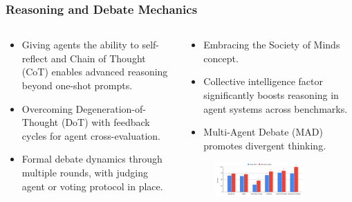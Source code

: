 \documentclass{beamer}
\begin{document}
\begin{frame}
    \frametitle{Reasoning and Debate Mechanics}
    
    \begin{columns}[T] %
        \begin{column}{.5\textwidth}
            \textbf{}
            \begin{itemize}
                \item Giving agents the ability to self-reflect and Chain of Thought (CoT) enables advanced reasoning beyond one-shot prompts.
                \item Overcoming Degeneration-of-Thought (DoT) with feedback cycles for agent cross-evaluation.
                \item Formal debate dynamics through multiple rounds, with judging agent or voting protocol in place.
            \end{itemize}
        \end{column}
        \begin{column}{.5\textwidth}
            \textbf{}
            \begin{itemize}
                \item Embracing the Society of Minds concept.
                \item Collective intelligence factor significantly boosts reasoning in agent systems across benchmarks.
                \item Multi-Agent Debate (MAD) promotes divergent thinking.
            \end{itemize}
            \begin{figure}
                \includegraphics[width=0.8\textwidth]{debate_improvements.png}
            \end{figure}
        \end{column}
    \end{columns}
    \end{frame}
        
\end{document}
